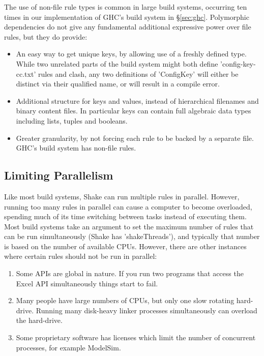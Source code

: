 The use of non-file rule types is common in large build systems, occurring ten times in our implementation of GHC's build system in \S\ref{sec:ghc}. Polymorphic dependencies do not give any fundamental additional expressive power over file rules, but they do provide:

\begin{itemize}
\item An easy way to get unique keys, by allowing use of a freshly defined type. While two unrelated parts of the build system might both define \lst'config-key-cc.txt' rules and clash, any two definitions of \lst'ConfigKey' will either be distinct via their qualified name, or will result in a compile error.
\item Additional structure for keys and values, instead of hierarchical filenames and binary content files. In particular keys can contain full algebraic data types including lists, tuples and booleans.
\item Greater granularity, by not forcing each rule to be backed by a separate file. GHC's build system has  non-file rules.
\end{itemize}
 
\subsection{Limiting Parallelism}

Like most build systems, Shake can run multiple rules in parallel. However, running too many rules in parallel can cause a computer to become overloaded, spending much of its time switching between tasks instead of executing them. Most build systems take an argument to set the maximum number of rules that can be run simultaneously (Shake has \lst'shakeThreads'), and typically that number is based on the number of available CPUs. However, there are other instances where certain rules should not be run in parallel:

\begin{enumerate}
\item Some APIs are global in nature. If you run two programs that access the Excel API simultaneously things start to fail.
\item Many people have large numbers of CPUs, but only one slow rotating hard-drive. Running many disk-heavy linker processes simultaneously can overload the hard-drive.
\item Some proprietary software has licenses which limit the number of concurrent processes, for example ModelSim.
\end{enumerate}

